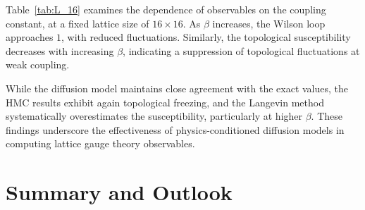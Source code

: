 \documentclass[a4paper,11pt]{article}
\begin{document}
\begin{table}[hbpt!] 
    \centering 
    \caption{Comparison of observables for $L=16$ at different couplings}
    \label{tab:L_16}
    \renewcommand{\arraystretch}{1.3}
\end{table}

Table~\ref{tab:L_16} examines the dependence of observables on the coupling constant, at a fixed lattice size of $16\times 16$. As $\beta$ increases, the Wilson loop approaches $1$, with reduced fluctuations. Similarly, the topological susceptibility decreases with increasing $\beta$, indicating a suppression of topological fluctuations at weak coupling.


While the diffusion model maintains close agreement with the exact values, the HMC results exhibit again topological freezing, and the Langevin method systematically overestimates the susceptibility, particularly at higher $\beta$. These findings underscore the effectiveness of physics-conditioned diffusion models in computing lattice gauge theory observables.




\section{Summary and Outlook}
\label{sec:outlook}
\end{document}
